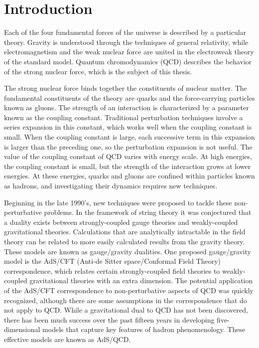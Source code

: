 \chapter{Introduction}
\label{intro_chapter}

Each of the four fundamental forces of the universe is described by a particular theory. 
Gravity is understood through the techniques of general relativity, while electromagnetism and the weak nuclear force are united in the electroweak theory of the standard model.
Quantum chromodynamics (QCD) describes the behavior of the strong nuclear force, which is the subject of this thesis.

The strong nuclear force binds together the constituents of nuclear matter.
The fundamental constituents of the theory are quarks and the force-carrying particles known as gluons.
The strength of an interaction is characterized by a parameter known as the coupling constant. 
Traditional perturbation techniques involve a series expansion in this constant, which works well when the coupling constant is small.
When the coupling constant is large, each successive term in this expansion is larger than the preceding one, so the perturbation expansion is not useful.
The value of the coupling constant of QCD varies with energy scale.
At high energies, the coupling constant is small, but the strength of the interaction grows at lower energies.
At these energies, quarks and gluons are confined within particles known as hadrons, and investigating their dynamics requires new techniques.

Beginning in the late 1990's, new techniques were proposed to tackle these non-perturbative problems.
In the framework of string theory it was conjectured that a duality exists between strongly-coupled gauge theories and weakly-coupled gravitational theories.
Calculations that are analytically intractable in the field theory can be related to more easily calculated results from the gravity theory. 
These models are known as gauge/gravity dualities.
One proposed gauge/gravity model is the AdS/CFT (Anti-de Sitter space/Conformal Field Theory) correspondence, which relates certain strongly-coupled field theories to weakly-coupled gravitational theories with an extra dimension.
The potential application of the AdS/CFT correspondence to non-perturbative aspects of QCD was quickly recognized, although there are some assumptions in the correspondence that do not apply to QCD.
While a gravitational dual to QCD has not been discovered, there has been much success over the past fifteen years in developing five-dimensional models that capture key features of hadron phenomenology.
These effective models are known as AdS/QCD.

